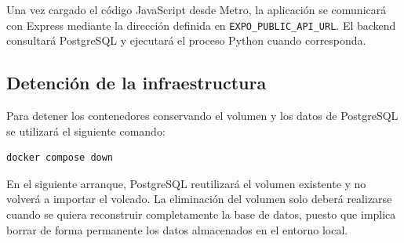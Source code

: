 Una vez cargado el c\'odigo JavaScript desde Metro, la aplicaci\'on se comunicar\'a
con Express mediante la direcci\'on definida en
\texttt{EXPO\_PUBLIC\_API\_URL}. El backend consultar\'a PostgreSQL y ejecutar\'a
el proceso Python cuando corresponda.

\subsection{Detenci\'on de la infraestructura}

Para detener los contenedores conservando el volumen y los datos de PostgreSQL se
utilizar\'a el siguiente comando:

\begin{lstlisting}
docker compose down
\end{lstlisting}

En el siguiente arranque, PostgreSQL reutilizar\'a el volumen existente y no
volver\'a a importar el volcado. La eliminaci\'on del volumen solo deber\'a
realizarse cuando se quiera reconstruir completamente la base de datos, puesto
que implica borrar de forma permanente los datos almacenados en el entorno local.
